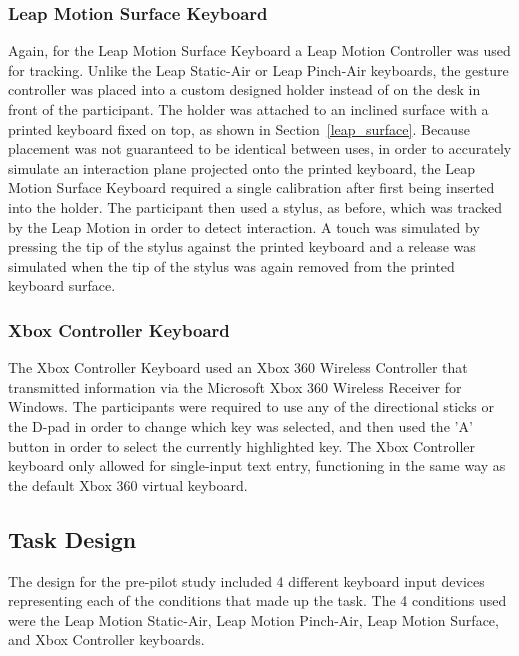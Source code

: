 \subsubsection{Leap Motion Surface Keyboard}
Again, for the Leap Motion Surface Keyboard a Leap Motion Controller was used for tracking. Unlike the Leap Static-Air or Leap Pinch-Air keyboards, the gesture controller was placed into a custom designed holder instead of on the desk in front of the participant. The holder was attached to an inclined surface with a printed keyboard fixed on top, as shown in Section~\ref{leap_surface}. Because placement was not guaranteed to be identical between uses, in order to accurately simulate an interaction plane projected onto the printed keyboard, the Leap Motion Surface Keyboard required a single calibration after first being inserted into the holder. The participant then used a stylus, as before, which was tracked by the Leap Motion in order to detect interaction. A touch was simulated by pressing the tip of the stylus against the printed keyboard and a release was simulated when the tip of the stylus was again removed from the printed keyboard surface.

\subsubsection{Xbox Controller Keyboard}
The Xbox Controller Keyboard used an Xbox 360 Wireless Controller that transmitted information via the Microsoft Xbox 360 Wireless Receiver for Windows. The participants were required to use any of the directional sticks or the D-pad in order to change which key was selected, and then used the 'A' button in order to select the currently highlighted key. The Xbox Controller keyboard only allowed for single-input text entry, functioning in the same way as the default Xbox 360 virtual keyboard. 

\subsection{Task Design} \label{pre_task}
The design for the pre-pilot study included 4 different keyboard input devices representing each of the conditions that made up the task. The 4 conditions used were the Leap Motion Static-Air, Leap Motion Pinch-Air, Leap Motion Surface, and Xbox Controller keyboards.

